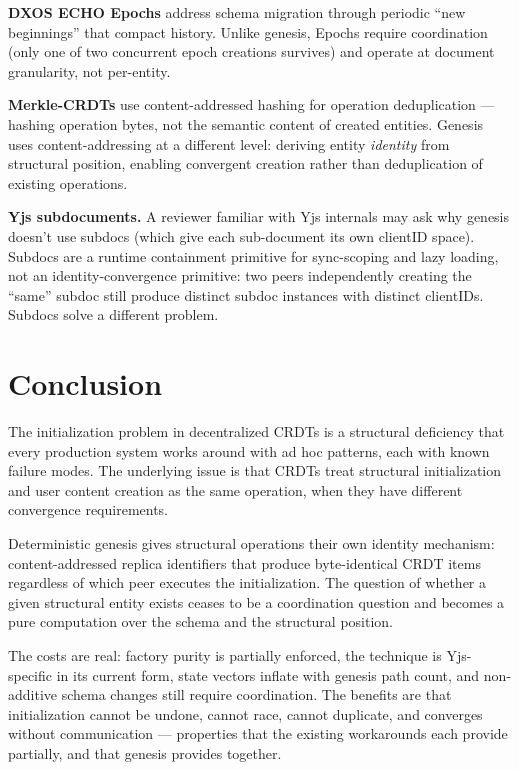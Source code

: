 \textbf{DXOS ECHO Epochs}\cite{dxos:epochs} address schema migration through periodic ``new beginnings'' that compact history. Unlike genesis, Epochs require coordination (only one of two concurrent epoch creations survives) and operate at document granularity, not per-entity.

\textbf{Merkle-CRDTs}\cite{sanjuan2020merkle} use content-addressed hashing for operation deduplication --- hashing operation bytes, not the semantic content of created entities. Genesis uses content-addressing at a different level: deriving entity \emph{identity} from structural position, enabling convergent creation rather than deduplication of existing operations.

\textbf{Yjs subdocuments.} A reviewer familiar with Yjs internals may ask why genesis doesn't use subdocs (which give each sub-document its own clientID space). Subdocs are a runtime containment primitive for sync-scoping and lazy loading, not an identity-convergence primitive: two peers independently creating the ``same'' subdoc still produce distinct subdoc instances with distinct clientIDs. Subdocs solve a different problem.

\section{Conclusion}

The initialization problem in decentralized CRDTs is a structural deficiency that every production system works around with ad hoc patterns, each with known failure modes. The underlying issue is that CRDTs treat structural initialization and user content creation as the same operation, when they have different convergence requirements.

Deterministic genesis gives structural operations their own identity mechanism: content-addressed replica identifiers that produce byte-identical CRDT items regardless of which peer executes the initialization. The question of whether a given structural entity exists ceases to be a coordination question and becomes a pure computation over the schema and the structural position.

The costs are real: factory purity is partially enforced, the technique is Yjs-specific in its current form, state vectors inflate with genesis path count, and non-additive schema changes still require coordination. The benefits are that initialization cannot be undone, cannot race, cannot duplicate, and converges without communication --- properties that the existing workarounds each provide partially, and that genesis provides together.





